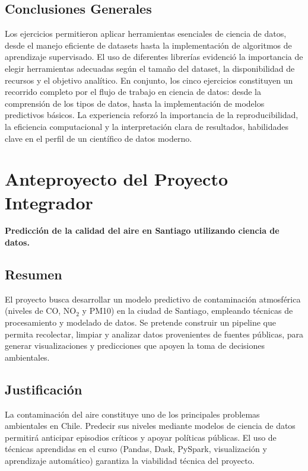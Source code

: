 \documentclass[12pt,a4paper]{article}
\begin{document}
\subsection{Conclusiones Generales}
Los ejercicios permitieron aplicar herramientas esenciales de ciencia de datos, desde el manejo eficiente de datasets hasta la implementación de algoritmos de aprendizaje supervisado.  
El uso de diferentes librerías evidenció la importancia de elegir herramientas adecuadas según el tamaño del dataset, la disponibilidad de recursos y el objetivo analítico.  
En conjunto, los cinco ejercicios constituyen un recorrido completo por el flujo de trabajo en ciencia de datos: desde la comprensión de los tipos de datos, hasta la implementación de modelos predictivos básicos.  
La experiencia reforzó la importancia de la reproducibilidad, la eficiencia computacional y la interpretación clara de resultados, habilidades clave en el perfil de un científico de datos moderno.

\section{Anteproyecto del Proyecto Integrador}

\textbf{Predicción de la calidad del aire en Santiago utilizando ciencia de datos.}

\subsection{Resumen}
El proyecto busca desarrollar un modelo predictivo de contaminación atmosférica (niveles de CO, NO$_2$ y PM10) en la ciudad de Santiago, empleando técnicas de procesamiento y modelado de datos.  
Se pretende construir un pipeline que permita recolectar, limpiar y analizar datos provenientes de fuentes públicas, para generar visualizaciones y predicciones que apoyen la toma de decisiones ambientales.

\subsection{Justificación}
La contaminación del aire constituye uno de los principales problemas ambientales en Chile.  
Predecir sus niveles mediante modelos de ciencia de datos permitirá anticipar episodios críticos y apoyar políticas públicas.  
El uso de técnicas aprendidas en el curso (Pandas, Dask, PySpark, visualización y aprendizaje automático) garantiza la viabilidad técnica del proyecto.
\end{document}
